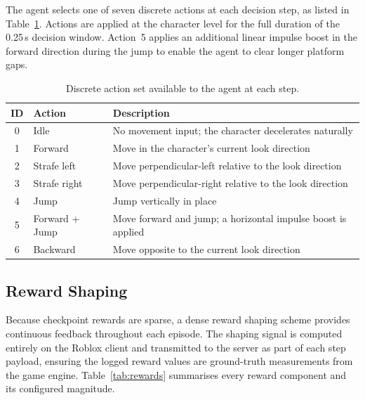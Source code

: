 \documentclass[11pt]{article}
\begin{document}
The agent selects one of seven discrete actions at each decision step,
as listed in Table~\ref{tab:actions}. Actions are applied at the
character level for the full duration of the 0.25\,s decision window.
Action~5 applies an additional linear impulse boost in the forward
direction during the jump to enable the agent to clear longer platform
gaps.

\begin{table}[htbp]
  \centering
  \caption{Discrete action set available to the agent at each step.}
  \label{tab:actions}
  \begin{tabular}{cll}
    \toprule
    ID & Action & Description \\
    \midrule
    0 & Idle             & No movement input; the character decelerates naturally \\
    1 & Forward          & Move in the character's current look direction \\
    2 & Strafe left      & Move perpendicular-left relative to the look direction \\
    3 & Strafe right     & Move perpendicular-right relative to the look direction \\
    4 & Jump             & Jump vertically in place \\
    5 & Forward + Jump   & Move forward and jump; a horizontal impulse boost is applied \\
    6 & Backward         & Move opposite to the current look direction \\
    \bottomrule
  \end{tabular}
\end{table}

\subsection{Reward Shaping}

Because checkpoint rewards are sparse, a dense reward shaping scheme
provides continuous feedback throughout each episode. The shaping
signal is computed entirely on the Roblox client and transmitted to
the server as part of each step payload, ensuring the logged reward
values are ground-truth measurements from the game engine.
Table~\ref{tab:rewards} summarises every reward component and its
configured magnitude.
\end{document}
